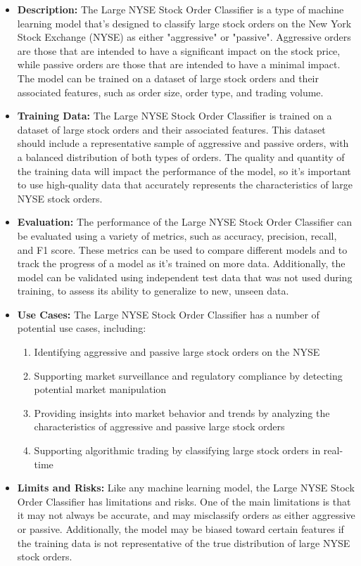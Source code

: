 \begin{itemize}
    \item \textbf{Description:} The Large NYSE Stock Order Classifier is a type of machine learning model that's designed to classify large stock orders on the New York Stock Exchange (NYSE) as either "aggressive" or "passive". Aggressive orders are those that are intended to have a significant impact on the stock price, while passive orders are those that are intended to have a minimal impact. The model can be trained on a dataset of large stock orders and their associated features, such as order size, order type, and trading volume.
    \item \textbf{Training Data:} The Large NYSE Stock Order Classifier is trained on a dataset of large stock orders and their associated features. This dataset should include a representative sample of aggressive and passive orders, with a balanced distribution of both types of orders. The quality and quantity of the training data will impact the performance of the model, so it's important to use high-quality data that accurately represents the characteristics of large NYSE stock orders.
    \item \textbf{Evaluation:} The performance of the Large NYSE Stock Order Classifier can be evaluated using a variety of metrics, such as accuracy, precision, recall, and F1 score. These metrics can be used to compare different models and to track the progress of a model as it's trained on more data. Additionally, the model can be validated using independent test data that was not used during training, to assess its ability to generalize to new, unseen data.
    \item \textbf{Use Cases:} The Large NYSE Stock Order Classifier has a number of potential use cases, including:
        \begin{enumerate}  
            \item Identifying aggressive and passive large stock orders on the NYSE
            \item Supporting market surveillance and regulatory compliance by detecting potential market manipulation
            \item Providing insights into market behavior and trends by analyzing the characteristics of aggressive and passive large stock orders
            \item Supporting algorithmic trading by classifying large stock orders in real-time
        \end{enumerate}
    \item \textbf{Limits and Risks:} Like any machine learning model, the Large NYSE Stock Order Classifier has limitations and risks. One of the main limitations is that it may not always be accurate, and may misclassify orders as either aggressive or passive. Additionally, the model may be biased toward certain features if the training data is not representative of the true distribution of large NYSE stock orders.

\end{itemize}
